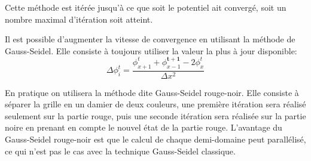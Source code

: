 Cette méthode est itérée jusqu'à ce que soit le potentiel ait convergé, soit un nombre maximal d'itération soit atteint.

Il est possible d'augmenter la vitesse de convergence en utilisant la méthode de Gauss-Seidel.
Elle consiste à toujours utiliser la valeur la plus à jour disponible:
\begin{equation}
\Delta \phi_i^t = \dfrac{\phi_{x+1}^t  + \phi_{x-1}^\mathbf{t+1}- 2\phi_{x}^t}{\Delta x ^2}
\end{equation}

En pratique on utilisera la méthode dite Gauss-Seidel rouge-noir.
Elle consiste à séparer la grille en un damier de deux couleurs, une première itération sera réalisé seulement sur la partie rouge, puis une seconde itération sera réalisée sur la partie noire en prenant en compte le nouvel état de la partie rouge. 
L'avantage du Gauss-Seidel rouge-noir est que le calcul de chaque demi-domaine peut parallélisé, ce qui n'est pas le cas avec la technique Gauss-Seidel classique.

